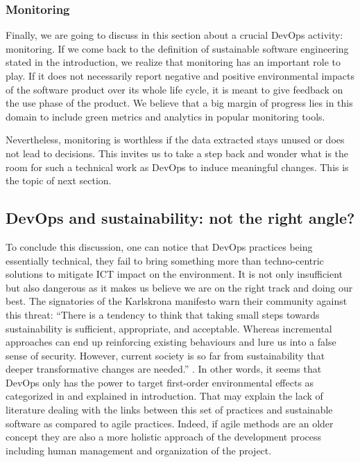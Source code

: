 \documentclass[11pt,twocolumn]{article}
\begin{document}
\subsubsection{Monitoring}
Finally, we are going to discuss in this section about a crucial DevOps activity: monitoring. If we come back to the definition of sustainable software engineering stated in the introduction, we realize that monitoring has an important role to play. If it does not necessarily report negative and positive environmental impacts of the software product over its whole life cycle, it is meant to give feedback on the use phase of the product. We believe that a big margin of progress lies in this domain to include green metrics and analytics in popular monitoring tools. 

Nevertheless, monitoring is worthless if the data extracted stays unused or does not lead to decisions. This invites us to take a step back and wonder what is the room for such a technical work as DevOps to induce meaningful changes. This is the topic of next section.


\subsection{DevOps and sustainability: not the right angle?}
\label{right_angle}
To conclude this discussion, one can notice that DevOps practices being essentially technical, they fail to bring something more than techno-centric solutions to mitigate ICT impact on the environment. It is not only insufficient but also dangerous as it makes us believe we are on the right track and doing our best. The signatories of the Karlskrona manifesto warn their community against this threat: ``There is a tendency to think that taking small steps towards sustainability is sufficient, appropriate, and acceptable. Whereas incremental approaches can end up reinforcing existing behaviours and lure us into a false sense of security. However, current society is so far from sustainability that deeper transformative changes are needed.'' \cite{beckerSustainabilityDesignSoftware2015}. In other words, it seems that DevOps only has the power to target first-order environmental effects as categorized in \cite{hiltyIctSustainabilityEmerging2015} and explained in introduction. That may explain the lack of literature dealing with the links between this set of practices and sustainable software as compared to agile practices. Indeed, if agile methods are an older concept they are also a more holistic approach of the development process including human management and organization of the project. 
\end{document}
